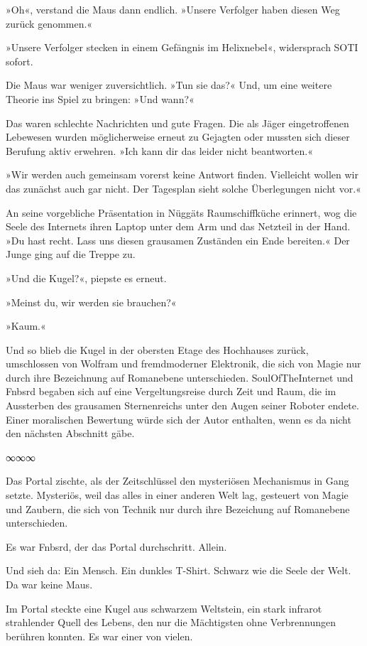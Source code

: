 »Oh«, verstand die Maus dann endlich. »Unsere Verfolger haben diesen Weg zurück genommen.«

»Unsere Verfolger stecken in einem Gefängnis im Helixnebel«, widersprach SOTI sofort.

Die Maus war weniger zuversichtlich. »Tun sie das?« Und, um eine weitere Theorie ins Spiel zu bringen: »Und wann?«

Das waren schlechte Nachrichten und gute Fragen. Die als Jäger eingetroffenen Lebewesen wurden möglicherweise erneut zu Gejagten oder mussten sich dieser Berufung aktiv erwehren. »Ich kann dir das leider nicht beantworten.«

»Wir werden auch gemeinsam vorerst keine Antwort finden. Vielleicht wollen wir das zunächst auch gar nicht. Der Tagesplan sieht solche Überlegungen nicht vor.«

An seine vorgebliche Präsentation in Nüggäts Raumschiffküche erinnert, wog die Seele des Internets ihren Laptop unter dem Arm und das Netzteil in der Hand. »Du hast recht. Lass uns diesen grausamen Zuständen ein Ende bereiten.« Der Junge ging auf die Treppe zu.

»Und die Kugel?«, piepste es erneut.

»Meinst du, wir werden sie brauchen?«

»Kaum.«

Und so blieb die Kugel in der obersten Etage des Hochhauses zurück, umschlossen von Wolfram und fremdmoderner Elektronik, die sich von Magie nur durch ihre Bezeichnung auf Romanebene unterschieden. SoulOfTheInternet und Fnbsrd begaben sich auf eine Vergeltungsreise durch Zeit und Raum, die im Aussterben des grausamen Sternenreichs unter den Augen seiner Roboter endete. Einer moralischen Bewertung würde sich der Autor enthalten, wenn es da nicht den nächsten Abschnitt gäbe.

\begin{center}
∞∞∞
\end{center}

Das Portal zischte, als der Zeitschlüssel den mysteriösen Mechanismus in Gang setzte. Mysteriös, weil das alles in einer anderen Welt lag, gesteuert von Magie und Zaubern, die sich von Technik nur durch ihre Bezeichung auf Romanebene unterschieden.

Es war Fnbsrd, der das Portal durchschritt. Allein.

Und sieh da: Ein Mensch. Ein dunkles T-Shirt. Schwarz wie die Seele der Welt. Da war keine Maus.

Im Portal steckte eine Kugel aus schwarzem Weltstein, ein stark infrarot strahlender Quell des Lebens, den nur die Mächtigsten ohne Verbrennungen berühren konnten. Es war einer von vielen.

